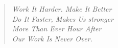 \chapter*{}

\vspace*{\fill} 
\begin{quote} 
\small
\begin{center}
\noindent \emph{Work It Harder. Make It Better}\\
\emph{Do It Faster, Makes Us stronger}\\
\emph{More Than Ever Hour After}\\
\emph{Our Work Is Never Over.}\\
\normalsize
{}
\end{center}

\end{quote}
\vspace*{\fill}